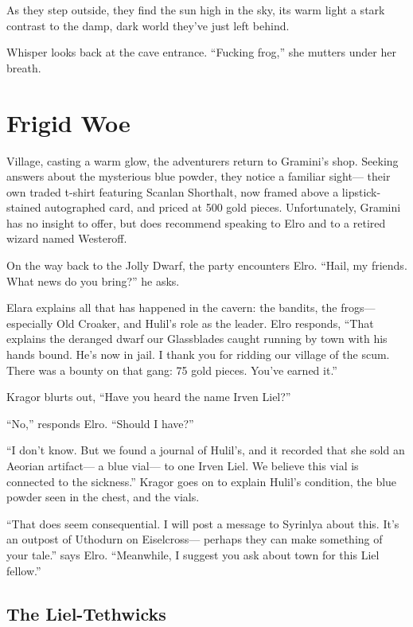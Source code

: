 \documentclass[
  letterpaper,12pt,twoside,twocolumn,openany,
  nodeprecatedcode,bg=full]{dndbook}
\begin{document}
As they step outside, they find the sun high in the sky, its warm light
a stark contrast to the damp, dark world they've just left behind.

Whisper looks back at the cave entrance. ``Fucking frog,'' she mutters
under her breath.

\chapter{Frigid Woe}\label{frigid-woe}

 Village, casting a warm
glow, the adventurers return to Gramini's shop. Seeking answers about
the mysterious blue powder, they notice a familiar sight--- their own
traded t-shirt featuring Scanlan Shorthalt, now framed above a
lipstick-stained autographed card, and priced at 500 gold pieces.
Unfortunately, Gramini has no insight to offer, but does recommend
speaking to Elro and to a retired wizard named Westeroff.

On the way back to the Jolly Dwarf, the party encounters Elro. ``Hail,
my friends. What news do you bring?'' he asks.

Elara explains all that has happened in the cavern: the bandits, the
frogs--- especially Old Croaker, and Hulil's role as the leader. Elro
responds, ``That explains the deranged dwarf our Glassblades caught
running by town with his hands bound. He's now in jail. I thank you for
ridding our village of the scum. There was a bounty on that gang: 75
gold pieces. You've earned it.''

Kragor blurts out, ``Have you heard the name Irven Liel?''

``No,'' responds Elro. ``Should I have?''

``I don't know. But we found a journal of Hulil's, and it recorded that
she sold an Aeorian artifact--- a blue vial--- to one Irven Liel. We
believe this vial is connected to the sickness.'' Kragor goes on to
explain Hulil's condition, the blue powder seen in the chest, and the
vials.

``That does seem consequential. I will post a message to Syrinlya about
this. It's an outpost of Uthodurn on Eiselcross--- perhaps they can make
something of your tale.'' says Elro. ``Meanwhile, I suggest you ask
about town for this Liel fellow.''

\section{The Liel-Tethwicks}\label{the-liel-tethwicks}
\end{document}
